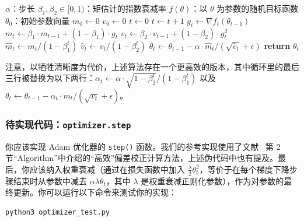 \documentclass[11pt]{article}
\begin{document}
\begin{algorithm}[h]
\caption{Adam 算法。$g_t^2$ 表示逐元素平方 $g_t \odot g_t$。所有对向量的操作都是逐元素的。我们用 $\beta_1^t$ 和 $\beta_2^t$ 表示 $\beta_1$ 和 $\beta_2$ 的 $t$ 次方。}
\begin{algorithmic}[1]
\Require $\alpha$：步长
\Require $\beta_1, \beta_2 \in [0, 1)$：矩估计的指数衰减率
\Require $f(\theta)$：以 $\theta$ 为参数的随机目标函数
\Require $\theta_0$：初始参数向量
\State $m_0 \leftarrow 0$ 
\State $v_0 \leftarrow 0$ 
\State $t \leftarrow 0$ 
  \State $t \leftarrow t + 1$
  \State $g_t \leftarrow \nabla f_t(\theta_{t-1})$ 
  \State $m_t \leftarrow \beta_1 \cdot m_{t-1} + (1 - \beta_1) \cdot g_t$ 
  \State $v_t \leftarrow \beta_2 \cdot v_{t-1} + (1 - \beta_2) \cdot g_t^2$ 
  \State $\hat{m}_t \leftarrow m_t / (1 - \beta_1^t)$ 
  \State $\hat{v}_t \leftarrow v_t / (1 - \beta_2^t)$ 
  \State $\theta_t \leftarrow \theta_{t-1} - \alpha \cdot \hat{m}_t / (\sqrt{\hat{v}_t} + \epsilon)$
\EndWhile
\State \textbf{return} $\theta_t$ 
\end{algorithmic}
\end{algorithm}

注意，以牺牲清晰度为代价，上述算法存在一个更高效的版本，其中循环里的最后三行被替换为以下两行：$\alpha_t \leftarrow \alpha \cdot \sqrt{1 - \beta_2^t} / (1 - \beta_1^t)$ 以及 $\theta_t \leftarrow \theta_{t-1} - \alpha_t \cdot m_t / (\sqrt{v_t} + \epsilon)$。

\subsubsection{待实现代码：\texttt{optimizer.step}}

你应该实现 Adam 优化器的 \texttt{step()} 函数。我们的参考实现使用了文献~\cite{kingma2014adam} 第 2 节``Algorithm''中介绍的``高效''偏差校正计算方法，上述伪代码中也有提及。最后，你应该纳入权重衰减（通过在损失函数中加入 $\frac{\lambda}{2}\theta_t^2$，等价于在每个梯度下降步骤结束时从参数中减去 $\alpha\lambda\theta_t$，其中 $\lambda$ 是权重衰减正则化参数），作为对参数的最终更新。你可以运行以下命令来测试你的实现：

\begin{lstlisting}[numbers=none]
python3 optimizer_test.py
\end{lstlisting}
\end{document}
